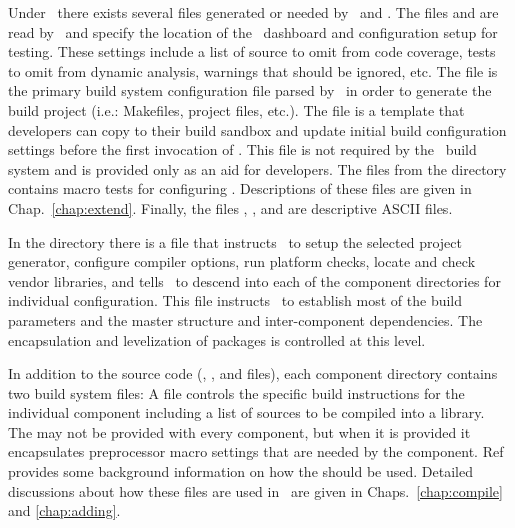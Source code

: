 Under \draco\ there exists several files generated or needed by \cmake\ and \ctest.  The files  and  are read by \ctest\ and specify the location of the \draco\ dashboard and configuration setup for testing.  These settings include a list of source to omit from code coverage, tests to omit from dynamic analysis, warnings that should be ignored, etc.  The  file is the primary build system configuration file parsed by \cmake\ in order to generate the build project (i.e.: Makefiles, project files, etc.).  The  file is a template that developers can copy to their build sandbox and update initial build configuration settings before the first invocation of \cmake.  This file is not required by the \draco\ build system and is provided only as an aid for developers.
The  files from the  directory 
contains macro tests for configuring \draco.  Descriptions
of these files are given in Chap.~\ref{chap:extend}.  Finally, the
files , , and  are
descriptive ASCII files.

In the  directory there is a  file that
instructs \cmake\ to setup the selected project generator, configure compiler options, run platform checks, locate and check vendor libraries, and tells \cmake\ to descend into each of the component directories for individual configuration. This file instructs \cmake\ to establish most of the build parameters and the master structure and inter-component dependencies.  The encapsulation and levelization of packages is controlled at this level.

In addition to the source code (, , and 
files), each component directory contains two build system files: 
A  file controls the specific build instructions for the individual component including a list of sources to be compiled into a library.  The  may not be provided with every component, but when it is provided it encapsulates preprocessor macro settings that are needed by the component.  Ref~\cite{autoconf} provides some background information on how the  should be used.  Detailed discussions about how these files are used in \draco\ are given in Chaps.~\ref{chap:compile} and \ref{chap:adding}.


